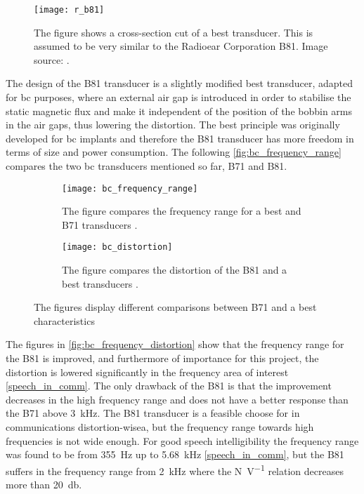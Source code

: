  \begin{figure}[H]
	\centering
		\texttt{[image: r\_b81]}
		\caption{The figure shows a cross-section cut of a \gls{best} transducer. This is assumed to be very similar to the Radioear Corporation B81. Image source:  \citep{the_balanced_2003}.}
		\label{fig:r_b81}
\end{figure}

The design of the B81 transducer is a slightly modified \gls{best} transducer, adapted for \gls{bc} purposes, where an external air gap is introduced in order to stabilise the static magnetic flux and make it independent of the position of the bobbin arms in the air gaps, thus lowering the distortion.  The \gls{best} principle was originally developed for \gls{bc} implants and therefore the B81 transducer has more freedom in terms of size and power consumption. The following \autoref{fig:bc_frequency_range} compares the two \gls{bc} transducers mentioned so far, B71 and B81.


\begin{figure}[H]
\centering
\begin{subfigure}[htbp]{0.48\textwidth}
		\texttt{[image: bc\_frequency\_range]}
		\caption{The figure compares the frequency range for a \gls{best} and B71 transducers \citep{the_balanced_2003}.}
		\label{fig:bc_frequency_range}
\end{subfigure}\hspace{10pt}
\begin{subfigure}[htbp]{0.48\textwidth}
		\texttt{[image: bc\_distortion]}
		\caption{The figure compares the distortion of the B81 and a \gls{best} transducers \citep{the_balanced_2003}.}
		\label{fig:bc_distortion}
\end{subfigure} 
\caption{The figures display different comparisons between B71 and a \gls{best} characteristics}
\label{fig:bc_frequency_distortion}
\end{figure}



The figures in \autoref{fig:bc_frequency_distortion} show that the frequency range for the B81 is improved, and furthermore of importance for this project, the distortion is lowered significantly in the frequency area of interest \autoref{speech_in_comm}. The only drawback of the B81 is that the improvement decreases in the high frequency range and does not have a better response than the B71 above \SI{3}{\kilo\hertz}. The B81 transducer is a feasible choose for  in communications distortion-wisea, but the frequency range towards high frequencies is not wide enough. For good speech intelligibility the frequency range was found to be from \SI{355}{\hertz} up to \SI{5.68}{\kilo\hertz}  \autoref{speech_in_comm}, but the B81 suffers in the frequency range from \SI{2}{\kilo\hertz} where the \si{\newton\per\volt} relation decreases more than \SI{20}{\decibel}.







